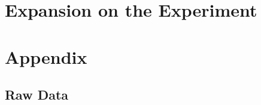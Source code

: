 \documentclass[12pt]{article}
\begin{document}
\section{Expansion on the Experiment}




\newpage







\newpage

\section*{Appendix}

\subsection*{Raw Data}

\listoffigures
\end{document}
